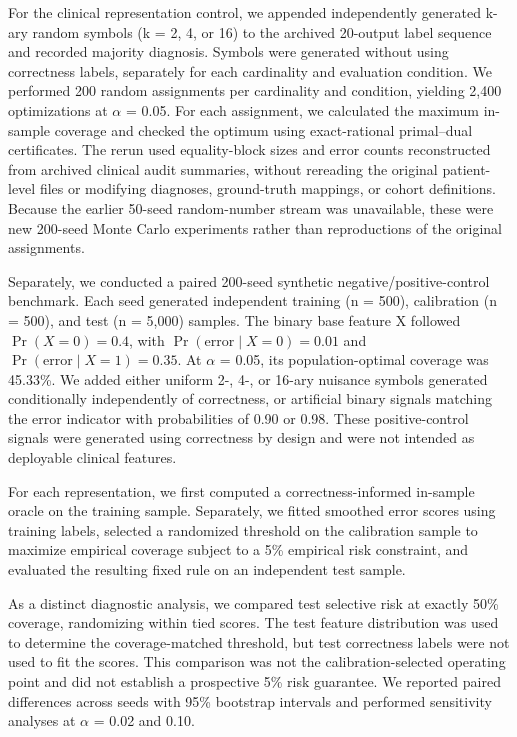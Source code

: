 \documentclass[letterpaper]{article}
\begin{document}
For the clinical representation control, we appended independently generated k-ary random symbols (k = 2, 4, or 16) to the archived 20-output label sequence and recorded majority diagnosis. Symbols were generated without using correctness labels, separately for each cardinality and evaluation condition. We performed 200 random assignments per cardinality and condition, yielding 2,400 optimizations at $\alpha$ = 0.05. For each assignment, we calculated the maximum in-sample coverage and checked the optimum using exact-rational primal--dual certificates. The rerun used equality-block sizes and error counts reconstructed from archived clinical audit summaries, without rereading the original patient-level files or modifying diagnoses, ground-truth mappings, or cohort definitions. Because the earlier 50-seed random-number stream was unavailable, these were new 200-seed Monte Carlo experiments rather than reproductions of the original assignments.

Separately, we conducted a paired 200-seed synthetic negative/positive-control benchmark. Each seed generated independent training (n = 500), calibration (n = 500), and test (n = 5,000) samples. The binary base feature X followed $\Pr(X=0)=0.4$, with $\Pr(\mathrm{error}\mid X=0)=0.01$ and $\Pr(\mathrm{error}\mid X=1)=0.35$. At $\alpha$ = 0.05, its population-optimal coverage was 45.33\%. We added either uniform 2-, 4-, or 16-ary nuisance symbols generated conditionally independently of correctness, or artificial binary signals matching the error indicator with probabilities of 0.90 or 0.98. These positive-control signals were generated using correctness by design and were not intended as deployable clinical features.

For each representation, we first computed a correctness-informed in-sample oracle on the training sample. Separately, we fitted smoothed error scores using training labels, selected a randomized threshold on the calibration sample to maximize empirical coverage subject to a 5\% empirical risk constraint, and evaluated the resulting fixed rule on an independent test sample.

As a distinct diagnostic analysis, we compared test selective risk at exactly 50\% coverage, randomizing within tied scores. The test feature distribution was used to determine the coverage-matched threshold, but test correctness labels were not used to fit the scores. This comparison was not the calibration-selected operating point and did not establish a prospective 5\% risk guarantee. We reported paired differences across seeds with 95\% bootstrap intervals and performed sensitivity analyses at $\alpha$ = 0.02 and 0.10.
\end{document}
